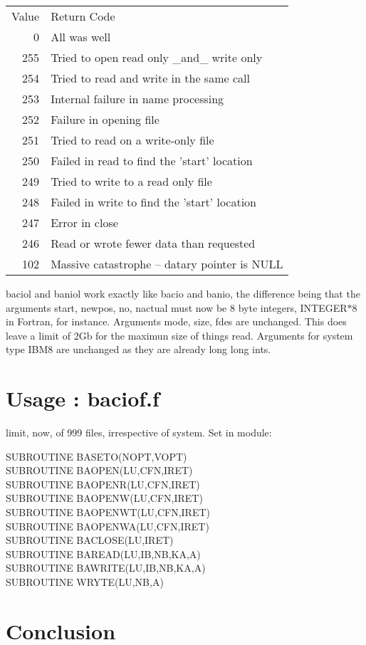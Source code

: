 \documentclass[11pt]{article}
\begin{document}
\begin{tabular}{rl}
Value & Return Code  \\
  0   & All was well                                   \\
255   & Tried to open read only \_and\_ write only     \\
254   & Tried to read and write in the same call       \\
253   & Internal failure in name processing            \\
252   & Failure in opening file   \\
251   & Tried to read on a write-only file             \\
250   & Failed in read to find the 'start' location    \\
249   & Tried to write to a read only file             \\
248   & Failed in write to find the 'start' location   \\
247   & Error in close                                 \\
246   & Read or wrote fewer data than requested        \\
102   & Massive catastrophe -- datary pointer is NULL  \\
\end{tabular}


baciol and baniol work exactly like bacio and banio, the difference
being that the arguments
start, newpos, no, nactual must now be 8 byte integers, INTEGER$*$8 in
Fortran, for instance.  Arguments mode, size, fdes are unchanged. 
This does leave a limit of 2Gb for the maximun size of things read.
Arguments for system type IBM8 are unchanged as they are already 
long long ints.


\section{Usage : baciof.f}
limit, now, of 999 files, irrespective of system.  Set in module:

      SUBROUTINE BASETO(NOPT,VOPT) \\
      SUBROUTINE BAOPEN(LU,CFN,IRET) \\
      SUBROUTINE BAOPENR(LU,CFN,IRET) \\
      SUBROUTINE BAOPENW(LU,CFN,IRET) \\
      SUBROUTINE BAOPENWT(LU,CFN,IRET) \\
      SUBROUTINE BAOPENWA(LU,CFN,IRET) \\
      SUBROUTINE BACLOSE(LU,IRET) \\
      SUBROUTINE BAREAD(LU,IB,NB,KA,A) \\
      SUBROUTINE BAWRITE(LU,IB,NB,KA,A) \\
      SUBROUTINE WRYTE(LU,NB,A) \\



\section{Conclusion}
\end{document}

